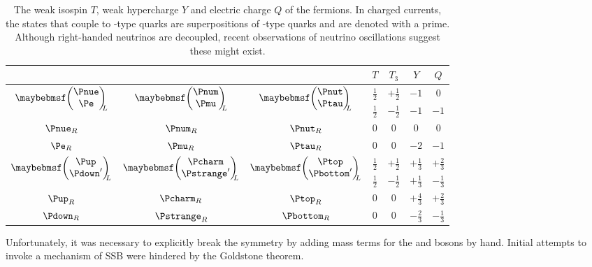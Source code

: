 \begin{table}[b]
	\begin{tabular}{ccc@{\hskip 1cm}cccc}
		& & & $T$ & $T_3$ & $Y$ & $Q$ \\
		\hline
		\multirow{2}{*}{$\colvector{\Pnue\\ \Pe}_{\!\!\!L}$} & 
		\multirow{2}{*}{$\colvector{\Pnum\\ \Pmu}_{\!\!\!L}$} & 
		\multirow{2}{*}{$\colvector{\Pnut\\ \Ptau}_{\!\!\!L}$} & 
		$\tfrac{1}{2}$ & $+\tfrac{1}{2}$ & $-1$ & 0 \\
		& & & $\tfrac{1}{2}$ & $-\tfrac{1}{2}$ & $-1$ & $-1$ \\
		$\Pnue_R$ & $\Pnum_R$ & $\Pnut_R$ & 0 & 0 & 0 & 0 \\
		$\Pe_R$ & $\Pmu_R$ & $\Ptau_R$ & 0 & 0 & $-2$ & $-1$ \\
		\hline
		\multirow{2}{*}{$\colvector{\Pup\\ \Pdown'}_{\!\!\!L}$} & 
		\multirow{2}{*}{$\colvector{\Pcharm\\ \Pstrange'}_{\!\!\!L}$} & 
		\multirow{2}{*}{$\colvector{\Ptop\\ \Pbottom'}_{\!\!\!L}$} & 
		$\tfrac{1}{2}$ & $+\tfrac{1}{2}$ & $+\tfrac{1}{3}$ & $+\tfrac{2}{3}$ \\
		& & & $\tfrac{1}{2}$ & $-\tfrac{1}{2}$ & $+\tfrac{1}{3}$ & $-\tfrac{1}{3}$ \\
		$\Pup_R$ & $\Pcharm_R$ & $\Ptop_R$ & 0 & 0 & $+\tfrac{4}{3}$ & $+\tfrac{2}{3}$ \\
		$\Pdown_R$ & $\Pstrange_R$ & $\Pbottom_R$ & 0 & 0 & $-\tfrac{2}{3}$ & $-\tfrac{1}{3}$ \\
	\end{tabular}
	\caption{The weak isospin $T$, weak hypercharge $Y$ and electric charge $Q$ of the 
	fermions. In charged currents, the states that couple to \Pup-type 
	quarks are superpositions of \Pdown-type quarks and are denoted with a prime. 
	Although right-handed neutrinos are decoupled, recent observations of neutrino 
	oscillations suggest these might exist.}
	\label{tab:ew_fermions}
\end{table}

Unfortunately, it was necessary to explicitly break the symmetry by adding mass terms for 
the \PWpm and \PZ bosons by hand. Initial attempts to invoke a mechanism of \ac{SSB} were 
hindered by the Goldstone theorem.



